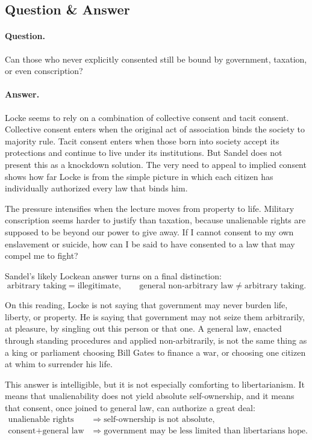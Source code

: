 \subsection{Question \& Answer}

\paragraph{Question.} Can those who never explicitly consented still be bound by government, taxation, or even conscription?

\paragraph{Answer.} Locke seems to rely on a combination of collective consent and tacit consent. Collective consent enters when the original act of association binds the society to majority rule. Tacit consent enters when those born into society accept its protections and continue to live under its institutions. But Sandel does not present this as a knockdown solution. The very need to appeal to implied consent shows how far Locke is from the simple picture in which each citizen has individually authorized every law that binds him.

The pressure intensifies when the lecture moves from property to life. Military conscription seems harder to justify than taxation, because unalienable rights are supposed to be beyond our power to give away. If I cannot consent to my own enslavement or suicide, how can I be said to have consented to a law that may compel me to fight?

Sandel's likely Lockean answer turns on a final distinction:
\begin{equation}
\text{arbitrary taking}=\text{illegitimate},
\qquad
\text{general non-arbitrary law}\neq \text{arbitrary taking}.
\end{equation}

On this reading, Locke is not saying that government may never burden life, liberty, or property. He is saying that government may not seize them arbitrarily, at pleasure, by singling out this person or that one. A general law, enacted through standing procedures and applied non-arbitrarily, is not the same thing as a king or parliament choosing Bill Gates to finance a war, or choosing one citizen at whim to surrender his life.

This answer is intelligible, but it is not especially comforting to libertarianism. It means that unalienability does not yield absolute self-ownership, and it means that consent, once joined to general law, can authorize a great deal:
\begin{align}
\text{unalienable rights} &\Longrightarrow \text{self-ownership is not absolute},\\
\text{consent}+\text{general law} &\Longrightarrow \text{government may be less limited than libertarians hope}.
\end{align}

